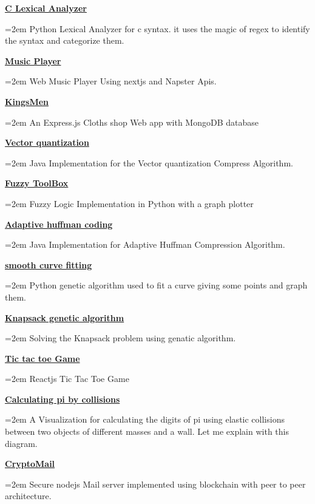\documentclass[paper=a4,fontsize=11pt]{scrartcl} %
\newcommand{\sepspace}{\vspace*{1em}}		%
\newcommand{\ProjectEntry}[2]{
		\noindent \textbf{#1} \hfill      %
		
		\noindent\hangindent=2em\hangafter=0 \small #2 %
		\normalsize 
		\sepspace
		}
\begin{document}
{\ProjectEntry{\href{https://github.com/peter44322/lexical-analyzer}{C Lexical Analyzer}}{
Python Lexical Analyzer for c syntax. it uses the magic of regex to identify the syntax and categorize them.
}


\ProjectEntry{\href{https://github.com/peter44322/react-songs-app}{Music Player}}{
Web Music Player Using nextjs and Napster Apis.
}

\ProjectEntry{\href{https://github.com/peter44322/KingsMen}{KingsMen}}{
An Express.js Cloths shop Web app with MongoDB database
}

\ProjectEntry{\href{https://github.com/peter44322/vector-quantization}{Vector quantization}}{
Java Implementation for the Vector quantization Compress Algorithm.
}

\ProjectEntry{\href{https://github.com/peter44322/FuzzyToolBox}{Fuzzy ToolBox}}{
Fuzzy Logic Implementation in Python with a graph plotter
}

\ProjectEntry{\href{https://github.com/peter44322/adaptive-huffman-coding}{Adaptive huffman coding}}{
Java Implementation for Adaptive Huffman Compression Algorithm.}

\ProjectEntry{\href{https://github.com/peter44322/smooth-curve-fitting-genetic-algorithm}{smooth curve fitting}}{
Python genetic algorithm used to fit a curve giving some points and graph them.}

\ProjectEntry{\href{https://github.com/peter44322/Knapsack-genetic-algorithm}{Knapsack genetic algorithm}}{Solving the Knapsack problem using genatic algorithm.}


\ProjectEntry{\href{https://github.com/peter44322/reactjs-tic-tac-toe}{Tic tac toe Game}}{Reactjs Tic Tac Toe Game}



\ProjectEntry{\href{https://github.com/peter44322/calculating-pi-by-collision}{Calculating pi by collisions}}{A Visualization for calculating the digits of pi using elastic collisions between two objects of different masses and a wall. Let me explain with this diagram.}

\ProjectEntry{\href{https://github.com/peter44322/CryptoMail}{CryptoMail}}{Secure nodejs Mail server implemented using blockchain with peer to peer architecture.}

}
\end{document}
